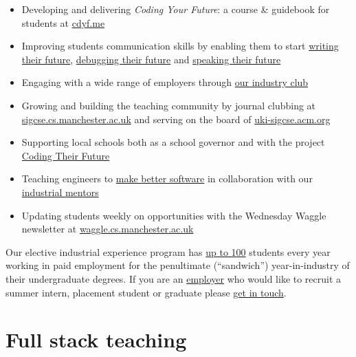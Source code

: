 \documentclass[
  12pt,
]{book}
\providecommand{\tightlist}{%
  \setlength{\itemsep}{0pt}\setlength{\parskip}{0pt}}
\begin{document}
\begin{itemize}
\tightlist
\item
  Developing and delivering \emph{Coding Your Future}: a course \& guidebook for students at \href{https://www.cdyf.me}{cdyf.me}
\item
  Improving students communication skills by enabling them to start \href{https://www.cdyf.me/writing}{writing their future}, \href{https://www.cdyf.me/debugging}{debugging their future} and \href{https://www.cdyf.me/speaking}{speaking their future}
\item
  Engaging with a wide range of employers through \href{https://www.cs.manchester.ac.uk/connect/business-engagement/}{our industry club}
\item
  Growing and building the teaching community by journal clubbing at \href{https://sigcse.cs.manchester.ac.uk/}{sigcse.cs.manchester.ac.uk} and serving on the board of \href{https://uki-sigcse.acm.org/}{uki-sigcse.acm.org}
\item
  Supporting local schools both as a school governor and with the project \href{https://personalpages.manchester.ac.uk/staff/duncan.hull/coding-their-future.html}{Coding Their Future}
\item
  Teaching engineers to \href{https://software-eng.netlify.app/}{make better software} in collaboration with our \href{https://www.cs.manchester.ac.uk/connect/business-engagement/industrial-mentoring/}{industrial mentors}
\item
  Updating students weekly on opportunities with the Wednesday Waggle newsletter at \href{https://waggle.cs.manchester.ac.uk/waggle/about}{waggle.cs.manchester.ac.uk} 🐝
\end{itemize}

Our elective industrial experience program has \protect\hyperlink{employability}{up to 100} students every year working in paid employment for the penultimate (``sandwich'') year-in-industry of their undergraduate degrees. If you are an \href{https://personalpages.manchester.ac.uk/staff/duncan.hull/employers.html}{employer} who would like to recruit a summer intern, placement student or graduate please \href{https://personalpages.manchester.ac.uk/staff/duncan.hull/contact.html}{get in touch}.

\hypertarget{full-stack-teaching}{%
\section*{Full stack teaching}\label{full-stack-teaching}}
\end{document}
